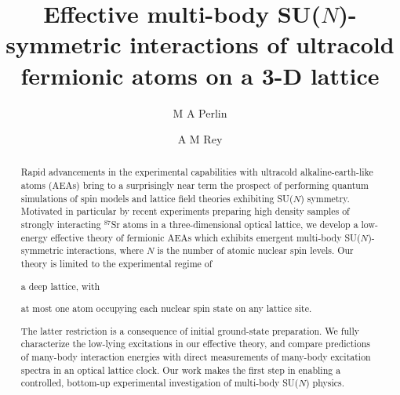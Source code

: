 \documentclass[preprint,showkeys,nofootinbib]{revtex4-1}
\newcommand{\1}{\mathds{1}}
\begin{document}
\title{Effective multi-body SU($N$)-symmetric interactions of
  ultracold fermionic atoms on a 3-D lattice}

\author{M A Perlin}
\author{A M Rey}

\begin{abstract}
  Rapid advancements in the experimental capabilities with ultracold
  alkaline-earth-like atoms (AEAs) bring to a surprisingly near term
  the prospect of performing quantum simulations of spin models and
  lattice field theories exhibiting SU($N$) symmetry.  Motivated in
  particular by recent experiments preparing high density samples of
  strongly interacting ${}^{87}$Sr atoms in a three-dimensional
  optical lattice, we develop a low-energy effective theory of
  fermionic AEAs which exhibits emergent multi-body SU($N$)-symmetric
  interactions, where $N$ is the number of atomic nuclear spin levels.
  Our theory is limited to the experimental regime of
  \begin{enumerate*}
  \item a deep lattice, with
  \item at most one atom occupying each nuclear spin state on any
    lattice site.
  \end{enumerate*}
  The latter restriction is a consequence of initial ground-state
  preparation.  We fully characterize the low-lying excitations in our
  effective theory, and compare predictions of many-body interaction
  energies with direct measurements of many-body excitation spectra in
  an optical lattice clock.  Our work makes the first step in enabling
  a controlled, bottom-up experimental investigation of multi-body
  SU($N$) physics.
\end{abstract}


\maketitle

\tableofcontents


\end{document}
